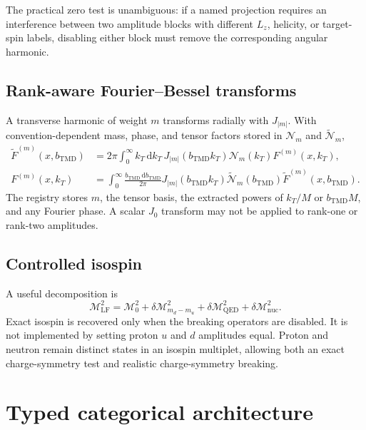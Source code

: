 \documentclass[11pt]{article}
\newcommand{\dd}{\mathrm{d}}
\newcommand{\LF}{\mathrm{LF}}
\newcommand{\cM}{\mathcal M}
\begin{document}
The practical zero test is unambiguous: if a named projection requires an
interference between two amplitude blocks with different \(L_z\), helicity,
or target-spin labels, disabling either block must remove the corresponding
angular harmonic.

\subsection{Rank-aware Fourier--Bessel transforms}

A transverse harmonic of weight \(m\) transforms radially with
\(J_{|m|}\).  With convention-dependent mass, phase, and tensor factors
stored in \(\mathcal N_m\) and \(\widetilde{\mathcal N}_m\),
\begin{align}
 \widetilde F^{(m)}(x,b_{\mathrm{TMD}})
 &=2\pi\int_0^\infty k_T\,\dd k_T\,
 J_{|m|}(b_{\mathrm{TMD}}k_T)
 \mathcal N_m(k_T)F^{(m)}(x,k_T),
\label{eq:rank-bessel-forward}\\
 F^{(m)}(x,k_T)
 &=\int_0^\infty\frac{b_{\mathrm{TMD}}\,\dd b_{\mathrm{TMD}}}{2\pi}
 J_{|m|}(b_{\mathrm{TMD}}k_T)
 \widetilde{\mathcal N}_m(b_{\mathrm{TMD}})
 \widetilde F^{(m)}(x,b_{\mathrm{TMD}}).
\label{eq:rank-bessel-inverse}
\end{align}
The registry stores \(m\), the tensor basis, the extracted powers of
\(k_T/M\) or \(b_{\mathrm{TMD}}M\), and any Fourier phase.  A scalar
\(J_0\) transform may not be applied to rank-one or rank-two amplitudes.

\subsection{Controlled isospin}

A useful decomposition is
\begin{equation}
 \cM_{\LF}^2
 =\cM_0^2
 +\delta\cM_{m_d-m_u}^2
 +\delta\cM_{\mathrm{QED}}^2
 +\delta\cM_{\mathrm{nuc}}^2.
\label{eq:isospin-breaking-mass}
\end{equation}
Exact isospin is recovered only when the breaking operators are disabled.
It is not implemented by setting proton \(u\) and \(d\) amplitudes equal.
Proton and neutron remain distinct states in an isospin multiplet, allowing
both an exact charge-symmetry test and realistic charge-symmetry breaking.

\section{Typed categorical architecture}
\label{sec:typed-categories}
\end{document}
